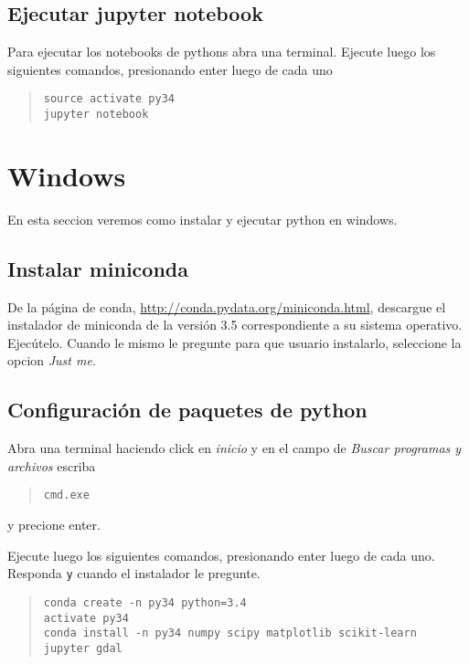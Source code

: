 \documentclass[hidelinks,12pt]{article}
\begin{document}
\subsection{Ejecutar jupyter notebook}
Para ejecutar los notebooks de pythons abra una terminal. Ejecute luego los 
siguientes comandos, presionando enter luego de cada uno

\begin{quote}
\begin{verbatim}
source activate py34
jupyter notebook
\end{verbatim}
\end{quote}

\section{Windows}
En esta seccion veremos como instalar y ejecutar python en windows.

\subsection{Instalar miniconda}

De la p\'agina de conda, \url{http://conda.pydata.org/miniconda.html}, descargue 
el instalador de miniconda de la versi\'on 3.5 correspondiente a su sistema
operativo. Ejec\'utelo. Cuando le mismo le pregunte para que usuario instalarlo,
seleccione la opcion \emph{Just me}.

\subsection{Configuraci\'on de paquetes de python}

Abra una terminal haciendo click en \emph{inicio} y en el campo de \emph{Buscar
programas y archivos} escriba 
\begin{quote}
\begin{verbatim}
cmd.exe
\end{verbatim}
\end{quote}
y precione enter.

Ejecute luego los siguientes comandos, presionando enter luego de cada uno. Responda 
\texttt{y} cuando el instalador le pregunte.

\begin{quote}
\begin{verbatim}
conda create -n py34 python=3.4
activate py34
conda install -n py34 numpy scipy matplotlib scikit-learn jupyter gdal
\end{verbatim}
\end{quote}
\end{document}

